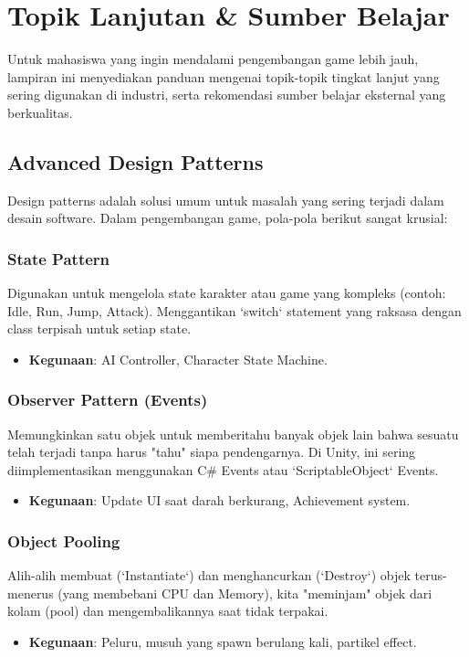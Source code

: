 
\chapter{Topik Lanjutan \& Sumber Belajar}

Untuk mahasiswa yang ingin mendalami pengembangan game lebih jauh, lampiran ini menyediakan panduan mengenai topik-topik tingkat lanjut yang sering digunakan di industri, serta rekomendasi sumber belajar eksternal yang berkualitas.

\section{Advanced Design Patterns}

Design patterns adalah solusi umum untuk masalah yang sering terjadi dalam desain software. Dalam pengembangan game, pola-pola berikut sangat krusial:

\subsection{State Pattern}
Digunakan untuk mengelola state karakter atau game yang kompleks (contoh: Idle, Run, Jump, Attack). Menggantikan `switch` statement yang raksasa dengan class terpisah untuk setiap state.
\begin{itemize}
    \item \textbf{Kegunaan}: AI Controller, Character State Machine.
\end{itemize}

\subsection{Observer Pattern (Events)}
Memungkinkan satu objek untuk memberitahu banyak objek lain bahwa sesuatu telah terjadi tanpa harus "tahu" siapa pendengarnya. Di Unity, ini sering diimplementasikan menggunakan C\# Events atau `ScriptableObject` Events.
\begin{itemize}
    \item \textbf{Kegunaan}: Update UI saat darah berkurang, Achievement system.
\end{itemize}

\subsection{Object Pooling}
Alih-alih membuat (`Instantiate`) dan menghancurkan (`Destroy`) objek terus-menerus (yang membebani CPU dan Memory), kita "meminjam" objek dari kolam (pool) dan mengembalikannya saat tidak terpakai.
\begin{itemize}
    \item \textbf{Kegunaan}: Peluru, musuh yang spawn berulang kali, partikel effect.
\end{itemize}

